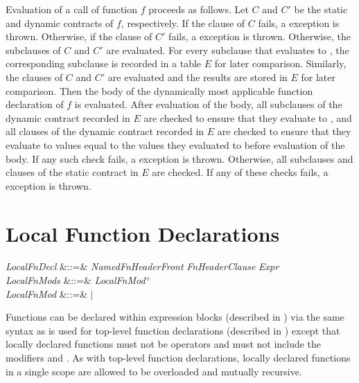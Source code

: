 Evaluation of a call of function $f$ proceeds as follows.
Let $C$ and $C'$ be the static and dynamic contracts of $f$, respectively.
If the  clause of $C$ fails,
a  exception is thrown.
%
Otherwise, if the  clause of $C'$ fails,
a  exception is thrown.
%
Otherwise, the  subclauses of $C$ and $C'$ are evaluated. For
every  subclause that evaluates to , the
corresponding  subclause is recorded in a table
$E$ for later comparison.  Similarly, the  clauses of $C$
and $C'$ are evaluated and the results are stored in $E$ for later
comparison.
%
Then the body of the dynamically most applicable function declaration of $f$
is evaluated.  After evaluation of the body,
%
all  subclauses of the dynamic contract recorded in $E$
are checked to ensure that they evaluate to , and
all  clauses of the dynamic contract recorded in $E$
are checked to ensure that they evaluate to values equal to the
values they evaluated to before evaluation of the body.
%
If any such check fails, a 
exception is thrown. Otherwise, all  subclauses and
 clauses of the static contract in $E$ are checked.
If any of these checks fails, a  exception
is thrown.

\section{Local Function Declarations}
\begin{Grammar}
\emph{LocalFnDecl} &::=&
\emph{NamedFnHeaderFront} \emph{FnHeaderClause} \EXP{=}
\emph{Expr} \\

\emph{LocalFnMods} &::=& \emph{LocalFnMod}$^+$\\

\emph{LocalFnMod} &::=&  $|$ \\
\end{Grammar}


Functions can be declared within expression blocks (described in
) via the same syntax as is used for top-level
function declarations (described in )
except that locally declared functions must not be operators
and must not include the modifiers  and .
As with top-level function declarations, locally declared functions in a
single scope are allowed to be overloaded and mutually recursive.
